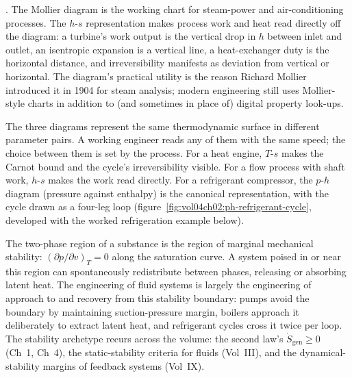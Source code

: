 

. The Mollier diagram is the
working chart for steam-power and air-conditioning processes. The
$h$-$s$ representation makes process work and heat read directly off
the diagram: a turbine's work output is the vertical drop in $h$
between inlet and outlet, an isentropic expansion is a vertical line,
a heat-exchanger duty is the horizontal distance, and irreversibility
manifests as deviation from vertical or horizontal. The diagram's
practical utility is the reason Richard Mollier introduced it in 1904
for steam analysis; modern engineering still uses Mollier-style
charts in addition to (and sometimes in place of) digital property
look-ups.

The three diagrams represent the same thermodynamic surface in
different parameter pairs. A working engineer reads any of them with
the same speed; the choice between them is set by the process. For a
heat engine, $T$-$s$ makes the Carnot bound and the cycle's
irreversibility visible. For a flow process with shaft work, $h$-$s$
makes the work read directly. For a refrigerant compressor, the
$p$-$h$ diagram (pressure against enthalpy) is the canonical
representation, with the cycle drawn as a four-leg loop
(figure~\ref{fig:vol04ch02:ph-refrigerant-cycle}, developed with the
worked refrigeration example below).



\begin{archetype}[Stability]
The two-phase region of a substance is the region of marginal
mechanical stability: $(\partial p/\partial v)_T = 0$ along the
saturation curve. A system poised in or near this region can
spontaneously redistribute between phases, releasing or absorbing
latent heat. The engineering of fluid systems is largely the
engineering of approach to and recovery from this stability boundary:
pumps avoid the boundary by maintaining suction-pressure margin,
boilers approach it deliberately to extract latent heat, and refrigerant
cycles cross it twice per loop. The stability archetype recurs
across the volume: the second law's $\dot{S}_{\text{gen}} \geq 0$
(Ch~1, Ch~4), the static-stability criteria for fluids (Vol~III), and
the dynamical-stability margins of feedback systems (Vol~IX).
\end{archetype}

